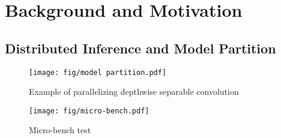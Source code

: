 
\section {Background and Motivation}
\label{sec-back}
\subsection{Distributed Inference and Model Partition}

\begin{figure}[!t]
    \centering
    \begin{minipage}{0.48\textwidth}
        \centering
        \texttt{[image: fig/model partition.pdf]}
        \caption{Example of parallelizing depthwise separable convolution}
        \label{fig:model-partition}
    \end{minipage}\hfill    
    \begin{minipage}{0.47\textwidth}
        \centering
        \texttt{[image: fig/micro-bench.pdf]}
        \caption{Micro-bench test}
        \label{fig:micro-bench}
    \end{minipage}
\end{figure}








